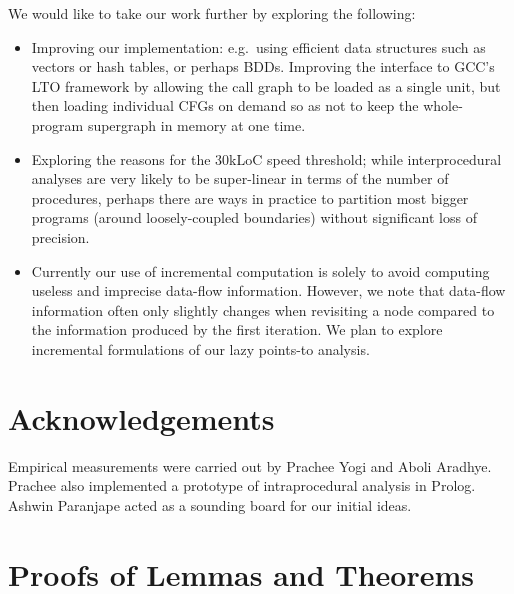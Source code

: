 \documentclass{llncs}
\begin{document}
We would like to take our work further by exploring the following:
\begin{itemize}
\item Improving our implementation: e.g.\ using
efficient data structures such as vectors or hash tables,
or perhaps BDDs.
Improving the interface to GCC's LTO framework by allowing the call graph
to be loaded as a single unit, but then loading
individual CFGs on demand so as not to keep the whole-program
supergraph in memory at one time.
\item Exploring the reasons for the 30kLoC speed threshold;
while interprocedural analyses are very likely to be super-linear
in terms of the number of procedures, perhaps there are ways in practice to
partition most bigger programs (around loosely-coupled boundaries)
without significant loss of precision.
\item Currently our use of incremental computation is solely to avoid
computing useless and imprecise data-flow information.  However, we note
that data-flow information often only slightly changes when revisiting a node
compared to the information produced by the first iteration.
We plan to explore incremental formulations of our lazy points-to analysis.
\end{itemize}


\section*{Acknowledgements}
Empirical measurements were carried out by Prachee Yogi and Aboli Aradhye. Prachee also implemented a prototype of intraprocedural
analysis in Prolog.  Ashwin Paranjape acted as a sounding board for our initial ideas.



\appendix
\setcounter{lemma}{0}
\setcounter{theorem}{0}
\setcounter{corollary}{0}

\section{Proofs of Lemmas and Theorems}
\label{app:proofs}
\end{document}
